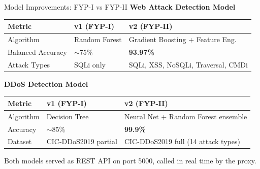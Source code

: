\documentclass[aspectratio=169,12pt]{beamer}
\begin{document}
\begin{frame}{Model Improvements: FYP-I vs FYP-II}
  \textbf{\textcolor{dcCyan}{Web Attack Detection Model}}\\[0.2em]
  \centering\footnotesize
  \begin{tabular}{@{} l l l @{}}
    \toprule
    \rowcolor{dcMid}
    \textcolor{dcCyan}{Metric} & \textcolor{dcGray}{v1 (FYP-I)} & \textcolor{dcGreen}{v2 (FYP-II)}\\
    \midrule
    Algorithm         & Random Forest       & Gradient Boosting + Feature Eng.\\
    \rowcolor{dcDark}
    Balanced Accuracy & $\sim$75\%          & \textbf{93.97\%}\\
    Attack Types      & SQLi only           & SQLi, XSS, NoSQLi, Traversal, CMDi\\
    \bottomrule
  \end{tabular}

  \vspace{0.5em}
  \textbf{\textcolor{dcCyan}{DDoS Detection Model}}\\[0.2em]
  \begin{tabular}{@{} l l l @{}}
    \toprule
    \rowcolor{dcMid}
    \textcolor{dcCyan}{Metric} & \textcolor{dcGray}{v1 (FYP-I)} & \textcolor{dcGreen}{v2 (FYP-II)}\\
    \midrule
    Algorithm   & Decision Tree        & Neural Net + Random Forest ensemble\\
    \rowcolor{dcDark}
    Accuracy    & $\sim$85\%           & \textbf{99.9\%}\\
    Dataset     & CIC-DDoS2019 partial & CIC-DDoS2019 full (14 attack types)\\
    \bottomrule
  \end{tabular}

  \vspace{0.3em}
  \raggedright
  \textcolor{dcGray}{\small Both models served as REST API on port 5000,
  called in real time by the proxy.}
\end{frame}
\end{document}
